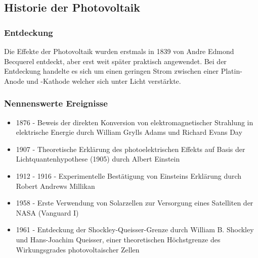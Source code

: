 \subsection{Historie der Photovoltaik}
    \subsubsection{Entdeckung}
        Die Effekte der Photovoltaik wurden erstmals in 1839 von Andre
        Edmond Becquerel entdeckt, aber erst weit später praktisch
        angewendet. Bei der Entdeckung handelte es sich um einen geringen
        Strom zwischen einer Platin-Anode und -Kathode welcher sich unter
        Licht verstärkte. \cite{Wiki_PhotovoltaicHistory}

    \subsubsection{Nennenswerte Ereignisse}
        \begin{itemize}
            \item 1876 - Beweis der direkten Konversion von
                elektromagnetischer Strahlung in elektrische Energie durch
                William Grylls Adams und Richard Evans Day
                \cite{Wiki_PhotovoltaicHistory}
            \item 1907 - Theoretische Erklärung des photoelektrischen Effekts
                auf Basis der Lichtquantenhypothese (1905) durch Albert
                Einstein \cite{Wiki_PhotovoltaicHistory}
            \item 1912 - 1916 - Experimentelle Bestätigung von Einsteins
                Erklärung durch Robert Andrews Millikan
                \cite{Wiki_PhotovoltaicHistory}
            \item 1958 - Erste Verwendung von Solarzellen zur Versorgung
                eines Satelliten der NASA (Vanguard I) \cite{Wiki_Vanguard}
            \item 1961 - Entdeckung der Shockley-Queisser-Grenze durch
                William B. Shockley und Hans-Joachim Queisser, einer
                theoretischen Höchstgrenze des Wirkungsgrades photovoltaischer
                Zellen \cite{Wiki_ShockleyQueisser}
        \end{itemize}